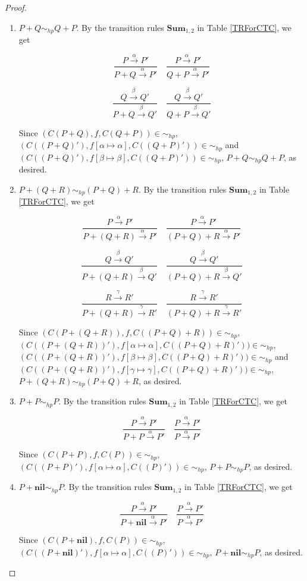 \begin{proof}
\begin{enumerate}
  \item $P+Q\sim_{hp} Q+P$. By the transition rules $\textbf{Sum}_{1,2}$ in Table \ref{TRForCTC}, we get

      $$\frac{P\xrightarrow{\alpha}P'}{P+ Q\xrightarrow{\alpha}P'} \quad \frac{P\xrightarrow{\alpha}P'}{Q+ P\xrightarrow{\alpha}P'}$$

      $$\frac{Q\xrightarrow{\beta}Q'}{P+ Q\xrightarrow{\beta}Q'} \quad \frac{Q\xrightarrow{\beta}Q'}{Q+ P\xrightarrow{\beta}Q'}$$

      Since $(C(P+ Q),f,C(Q+ P))\in\sim_{hp}$, $(C((P+ Q)'),f[\alpha\mapsto \alpha],C((Q+ P)'))\in\sim_{hp}$ and $(C((P+ Q)'),f[\beta\mapsto \beta],C((Q+ P)'))\in\sim_{hp}$, $P+ Q\sim_{hp} Q+ P$, as desired.
  \item $P+(Q+R)\sim_{hp} (P+Q)+R$. By the transition rules $\textbf{Sum}_{1,2}$ in Table \ref{TRForCTC}, we get

      $$\frac{P\xrightarrow{\alpha}P'}{P+(Q+R)\xrightarrow{\alpha}P'} \quad \frac{P\xrightarrow{\alpha}P'}{(P+Q)+R\xrightarrow{\alpha}P'}$$

      $$\frac{Q\xrightarrow{\beta}Q'}{P+(Q+R)\xrightarrow{\beta}Q'} \quad \frac{Q\xrightarrow{\beta}Q'}{(P+Q)+R\xrightarrow{\beta}Q'}$$

      $$\frac{R\xrightarrow{\gamma}R'}{P+(Q+R)\xrightarrow{\gamma}R'} \quad \frac{R\xrightarrow{\gamma}R'}{(P+Q)+R\xrightarrow{\gamma}R'}$$

      Since $(C(P+ (Q+R)),f,C((P+Q)+R))\in\sim_{hp}$, $(C((P+ (Q+R))'),f[\alpha\mapsto \alpha],C((P+Q)+R)'))\in\sim_{hp}$, $(C((P+ (Q+R))'),f[\beta\mapsto \beta],C((P+Q)+R)'))\in\sim_{hp}$ and $(C((P+ (Q+R))'),f[\gamma\mapsto \gamma],C((P+Q)+R)'))\in\sim_{hp}$, $P+(Q+R)\sim_{hp} (P+Q)+R$, as desired.
  \item $P+P\sim_{hp} P$. By the transition rules $\textbf{Sum}_{1,2}$ in Table \ref{TRForCTC}, we get

      $$\frac{P\xrightarrow{\alpha}P'}{P+ P\xrightarrow{\alpha}P'} \quad \frac{P\xrightarrow{\alpha}P'}{P\xrightarrow{\alpha}P'}$$

      Since $(C(P+P),f,C(P))\in\sim_{hp}$, $(C((P+ P)'),f[\alpha\mapsto \alpha],C((P)'))\in\sim_{hp}$, $P+ P\sim_{hp} P$, as desired.
  \item $P+\textbf{nil}\sim_{hp} P$. By the transition rules $\textbf{Sum}_{1,2}$ in Table \ref{TRForCTC}, we get

      $$\frac{P\xrightarrow{\alpha}P'}{P+ \textbf{nil}\xrightarrow{\alpha}P'} \quad \frac{P\xrightarrow{\alpha}P'}{P\xrightarrow{\alpha}P'}$$

      Since $(C(P+\textbf{nil}),f,C(P))\in\sim_{hp}$, $(C((P+ \textbf{nil})'),f[\alpha\mapsto \alpha],C((P)'))\in\sim_{hp}$, $P+ \textbf{nil}\sim_{hp} P$, as desired.
\end{enumerate}
\end{proof}

